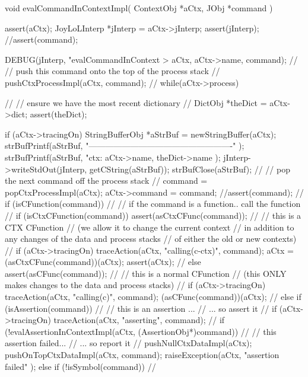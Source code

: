 \startCCode
void evalCommandInContextImpl(
  ContextObj *aCtx,
  JObj       *command
) {
  assert(aCtx);
  JoyLoLInterp *jInterp = aCtx->jInterp;
  assert(jInterp);
  //assert(command);
  
  DEBUG(jInterp, "evalCommandInContext > %
    aCtx, aCtx->name, command);
  //
  // push this command onto the top of the process stack
  //
  pushCtxProcessImpl(aCtx, command);
  //
  while(aCtx->process) {
    //
    // ensure we have the most recent dictionary
    //
    DictObj *theDict = aCtx->dict;
    assert(theDict);
    
    if (aCtx->tracingOn) {
      StringBufferObj *aStrBuf = newStringBuffer(aCtx);
      strBufPrintf(aStrBuf,
        "\n----------------------------------------------------\n"
      );
      strBufPrintf(aStrBuf,
        "ctx: %
        aCtx->name, theDict->name
      );
      jInterp->writeStdOut(jInterp, getCString(aStrBuf));
      strBufClose(aStrBuf);
    }
    //
    // pop the next command off the process stack
    //
    command = popCtxProcessImpl(aCtx);
    aCtx->command = command;
    //assert(command);
    //
    if (isCFunction(command)) {
      //
      // if the command is a function.. call the function
      //
      if (isCtxCFunction(command)) {
        assert(asCtxCFunc(command));
        //
        // this is a CTX CFunction
        // (we allow it to change the current context
        //  in addition to any changes of the data and process stacks
        //  of either the old or new contexts)
        //
        if (aCtx->tracingOn) 
          traceAction(aCtx, "calling(c-ctx)", command);
        aCtx = (asCtxCFunc(command))(aCtx);
        assert(aCtx);
        //
      } else {
        assert(asCFunc(command));
        //
        // this is a normal CFunction
        // (this ONLY makes changes to the data and process stacks)
        //
        if (aCtx->tracingOn) 
          traceAction(aCtx, "calling(c)", command);
        (asCFunc(command))(aCtx);
        //
      }
    } else if (isAssertion(command)) {
      //
      // this is an assertion ...
      //   ... so assert it 
      //
      if (aCtx->tracingOn) 
        traceAction(aCtx, "asserting", command);
      //
      if (!evalAssertionInContextImpl(aCtx, (AssertionObj*)command)) {
        //
        // this assertion failed... 
        //   ... so report it
        //
        pushNullCtxDataImpl(aCtx);
        pushOnTopCtxDataImpl(aCtx, command);
        raiseException(aCtx,
          "assertion failed"
        );
      }
    } else if (!isSymbol(command)) {
      //
}}}
